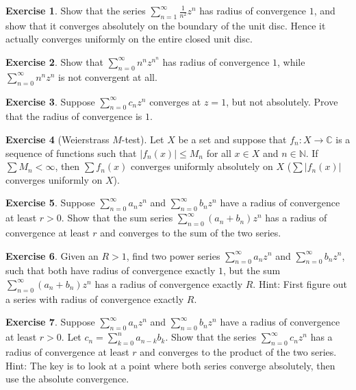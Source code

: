 \documentclass[12pt,openany]{book}
\newcommand{\sabs}[1]{\lvert {#1} \rvert}
\newcommand{\abs}[1]{\left\lvert {#1} \right\rvert}
\newcommand{\C}{{\mathbb{C}}}
\newcommand{\N}{{\mathbb{N}}}
\theoremstyle{plain}
\theoremstyle{remark}
\theoremstyle{definition}
\newenvironment{exbox}{%
    \def\FrameCommand{\vrule width 1pt \relax\hspace{10pt}}%
    \MakeFramed{\advance\hsize-\width\FrameRestore}%
}{%
    \endMakeFramed
}
\theoremstyle{exercise}
\newtheorem{exercise}{Exercise}[section]
\theoremstyle{example}
\begin{document}
\begin{exbox}
\begin{exercise}
Show that the series $\sum_{n=1}^\infty \frac{1}{n^2} z^{n}$ has radius of
convergence $1$, and
show that it converges absolutely on the boundary of the unit disc.  Hence
it actually converges uniformly on the entire closed unit disc.
\end{exercise}

\begin{exercise}
Show that
$\sum_{n=0}^\infty n^n z^{n^n}$ has radius of convergence $1$,
while
$\sum_{n=0}^\infty n^n z^{n}$ is not convergent at all.
\end{exercise}

\begin{exercise}
Suppose
$\sum_{n=0}^\infty c_n z^{n}$ converges at $z=1$, but not absolutely.
Prove that the radius of convergence is $1$.
\end{exercise}

\begin{exercise}[Weierstrass $M$-test]
\label{exercise:weierMtest}
Let $X$ be a set and suppose that $f_n \colon X \to \C$ is
a sequence of functions such that
$\abs{f_n(x)} \leq M_n$ for all $x \in X$ and $n \in \N$.  If $\sum M_n <
\infty$, then $\sum f_n(x)$ converges uniformly absolutely on $X$
($\sum \sabs{f_n(x)}$ converges uniformly on $X$).
\end{exercise}

\begin{exercise}
Suppose
$\sum_{n=0}^\infty a_n z^{n}$ and $\sum_{n=0}^\infty b_n z^{n}$
have a radius of convergence at least $r > 0$.  Show that
the sum series
$\sum_{n=0}^\infty (a_n+b_n) z^{n}$ has a radius of convergence at least
$r$ and converges to the sum of the two series.
\end{exercise}

\begin{exercise}
Given an $R > 1$, find two power series
$\sum_{n=0}^\infty a_n z^{n}$ and $\sum_{n=0}^\infty b_n z^{n}$,
such that both have radius of convergence exactly $1$, but the 
sum
$\sum_{n=0}^\infty (a_n+b_n) z^{n}$ has a radius of convergence 
exactly $R$.  Hint: First figure out a series with radius of convergence
exactly $R$.
\end{exercise}

\begin{exercise}
Suppose
$\sum_{n=0}^\infty a_n z^{n}$ and $\sum_{n=0}^\infty b_n z^{n}$
have a radius of convergence at least $r > 0$.  Let 
$c_n = \sum_{k=0}^n a_{n-k}b_k$.  Show that
the series
$\sum_{n=0}^\infty c_n z^{n}$ has a radius of convergence at least
$r$ and converges to the product of the two series.
Hint: The key is to look at a point where both series converge absolutely,
then use the absolute convergence.
\end{exercise}
\end{exbox}
\end{document}
